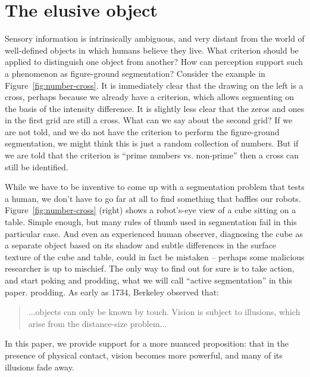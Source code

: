 \ifverbose 

\section{The elusive object}

\label{sect:introduction}

Sensory information is intrinsically ambiguous, and very distant from
the world of well-defined objects in which humans believe they live.  
What criterion should be applied to distinguish one object from
another?  How can perception support such a phenomenon as figure-ground
segmentation?  
Consider the example in Figure~\ref{fig:number-cross}.  It is
immediately clear that the drawing on the left is a cross, perhaps
because we already have a criterion, which allows segmenting on the
basis of the intensity difference. It is slightly less clear that the
zeros and ones in the first grid are still a cross. What can we say
about the second grid? If we are not told, and we do not have
the criterion to perform the figure-ground segmentation, we might
think this is just a random collection of numbers. But if we are told
that the criterion is ``prime numbers vs. non-prime'' then a cross can
still be identified.

While we have to be inventive to come up with a segmentation problem
that tests a human, we don't have to go far at all to find something
that baffles our robots.  Figure~\ref{fig:number-cross} (right) shows a
robot's-eye view of a cube sitting on a table.  Simple enough, but
many rules of thumb used in segmentation fail in this particular case.
And even an experienced human observer, diagnosing the cube as a
separate object based on its shadow and subtle differences in the
surface texture of the cube and table, could in fact be mistaken --
perhaps some malicious researcher is up to mischief.  The only way to
find out for sure is to take action, and start poking and 
\ifrev
prodding, what we will call ``active segmentation'' in this paper.
\else
prodding.
\fi
As early as 1734, Berkeley observed that:
%
\begin{quote}
...objects can only be known by
touch. Vision is subject to illusions, which arise from the
distance-size problem... \cite{berkeley72new}
\end{quote}
%
In this paper, we provide support for a more nuanced proposition: that
in the presence of physical contact, vision becomes more powerful, and many of
its illusions fade away.


